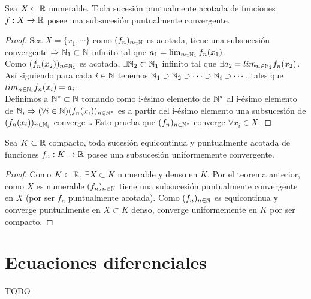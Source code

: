\begin{theorem}
  Sea $X \subset \mathbb{R}$ numerable. Toda sucesión puntualmente acotada de funciones $f: X \to \mathbb{R}$ posee una subsucesión puntualmente convergente.
  \begin{proof}
    Sea $X = \{x_1, \cdots\}$ como $(f_n)_{n \in \mathbb{N}}$ es acotada, tiene una subsucesión convergente $\Rightarrow \mathbb{N}_1 \subset \mathbb{N}$ infinito tal que $a_1 = \lim_{n \in \mathbb{N}_1} f_n(x_1)$. \\
    Como $(f_n(x_2))_{n \in \mathbb{N}_1}$ es acotada, $\exists \mathbb{N}_2 \subset \mathbb{N}_1$ infinito tal que $\exists a_2 = lim_{n \in \mathbb{N}_2} f_n(x_2)$. Así siguiendo para cada $i \in \mathbb{N}$ tenemos $\mathbb{N}_1 \supset \mathbb{N}_2 \supset \cdots \supset \mathbb{N}_i \supset \cdots$, tales que $lim_{n \in \mathbb{N}_i} f_n(x_i) = a_i$. \\
    Definimos a $\mathbb{N}^* \subset \mathbb{N}$ tomando como i-ésimo elemento de $\mathbb{N}^*$ al i-ésimo elemento de $\mathbb{N}_i \Rightarrow (\forall i \in \mathbb{N}) (f_n(x_i))_{n \in \mathbb{N}^*}$ es a partir del i-ésimo elemento una subsucesión de $(f_n(x_i))_{n \in \mathbb{N}_i}$ converge $\therefore$ Esto prueba que $(f_n)_{n \in \mathbb{N}^*}$ converge $\forall x_i \in X$.
  \end{proof}
\end{theorem}

\begin{theorem}
  Sea $K \subset \mathbb{R}$ compacto, toda sucesión equicontinua y puntualmente acotada de funciones $f_n: K \to \mathbb{R}$ posee una subsucesión uniformemente convergente.
  \begin{proof}
    Como $K \subset \mathbb{R}$, $\exists X \subset K$ numerable y denso en $K$. Por el teorema anterior, como $X$ es numerable $(f_n)_{n \in \mathbb{N}}$ tiene una subsucesión puntualmente convergente en $X$ (por ser $f_n$ puntualmente acotada). Como $(f_n)_{n \in \mathbb{N}}$ es equicontinua y converge puntualmente en $X \subset K$ denso, converge uniformemente en $K$ por ser compacto. 
  \end{proof}
\end{theorem}

\section{Ecuaciones diferenciales}
TODO 
